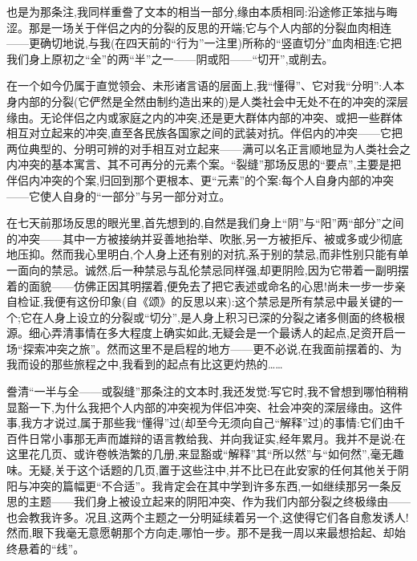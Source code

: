 也是为那条注,我同样重誊了文本的相当一部分,缘由本质相同:沿途修正笨拙与晦涩。那是一场关于伴侣之内的分裂的反思的开端;它与个人内部的分裂血肉相连——更确切地说,与我(在四天前的“行为”一注里)所称的“竖直切分”血肉相连:它把我们身上原初之“全”的两“半”之一——阴或阳——“切开”,或削去。

在一个如今仍属于直觉领会、未形诸言语的层面上,我“懂得”、它对我“分明”:人本身内部的分裂(它俨然是全然由制约造出来的)是人类社会中无处不在的冲突的深层缘由。无论伴侣之内或家庭之内的冲突,还是更大群体内部的冲突、或把一些群体相互对立起来的冲突,直至各民族各国家之间的武装对抗。伴侣内的冲突——它把两位典型的、分明可辨的对手相互对立起来——满可以名正言顺地显为人类社会之内冲突的基本寓言、其不可再分的元素个案。“裂缝”那场反思的“要点”,主要是把伴侣内冲突的个案,归回到那个更根本、更“元素”的个案:每\dmark{}个人自身内部的冲突——它使人自身的“一部分”与另一部分对立。

在七天前那场反思的眼光里,首先想到的,自然是我们身上“阴”与“阳”两“部分”之间的冲突——其中一方被接纳并妥善地抬举、吹胀,另一方被拒斥、被或多或少彻底地压抑。然而我心里明白,个人身上还有别的对抗,系于别的禁忌,而非性别只能有单一面向的禁忌。诚然,后一种禁忌与乱伦禁忌同样强,却更阴险,因为它带着一副明摆着的面貌——仿佛正因其明摆着,便免去了把它表述或命名的心思!尚未一步一步亲自检证,我便有这份印象(自《颂》的反思以来):这个禁忌是所有禁忌中最关键的一个;它在人身上设立的分裂或“切分”,是人身上积习已深的分裂之诸多侧面的终极根源。细心弄清事情在多大程度上确实如此,无疑会是一个最诱人的起点,足资开启一场“探索冲突之旅”。然而这里不是启程的地方——更不必说,在我面前摆着的、为我而设的那些旅程之中,我看到的起点有比这更灼热的……

誊清“一半与全——或裂缝”那条注的文本时,我还发觉:写它时,我不曾想到哪怕稍稍显豁一下,为什么我把个人内部的冲突视为伴侣冲突、社会冲突的深层缘由。这件事,我方才说过,属于那些我“懂得”过(却至今无须向自己“解释”过)的事情:它们由千百件日常小事那无声而雄辩的语言教给我、并向我证实,经年累月。我并不是说:在这里花几页、或许卷帙浩繁的几册,来显豁或“解释”其“所以然”与“如何然”,毫无趣味。无疑,关于这个话题的几页,置于这些注中,并不比已在此安家的任何其他关于阴阳与冲突的篇幅更“不合适”。我肯定会在其中学到许多东西,一如继续那另一条反思的主题——我们身上被设立起来的阴阳冲突、作为我们内部分裂之终极缘由——也会教我许多。\dmark{}况且,这两个主题之一分明延续着另一个,这使得它们各自愈发诱人!然而,眼下我毫无意愿朝那个方向走,哪怕一步。那不是我一周以来最想拾起、却始终悬着的“线”。

